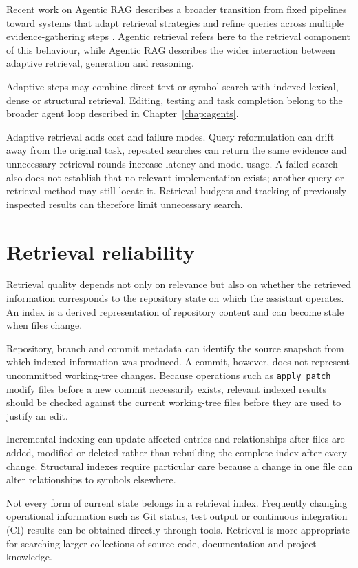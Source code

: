 Recent work on Agentic RAG describes a broader transition from fixed pipelines toward systems that adapt retrieval strategies and refine queries across multiple evidence-gathering steps \parencite{singh2025agenticrag}. Agentic retrieval refers here to the retrieval component of this behaviour, while Agentic RAG describes the wider interaction between adaptive retrieval, generation and reasoning.

Adaptive steps may combine direct text or symbol search with indexed lexical, dense or structural retrieval. Editing, testing and task completion belong to the broader agent loop described in Chapter~\ref{chap:agents}.

Adaptive retrieval adds cost and failure modes. Query reformulation can drift away from the original task, repeated searches can return the same evidence and unnecessary retrieval rounds increase latency and model usage. A failed search also does not establish that no relevant implementation exists; another query or retrieval method may still locate it. Retrieval budgets and tracking of previously inspected results can therefore limit unnecessary search.

\section{Retrieval reliability}
\label{sec:retrieval-reliability}

Retrieval quality depends not only on relevance but also on whether the retrieved information corresponds to the repository state on which the assistant operates. An index is a derived representation of repository content and can become stale when files change.

Repository, branch and commit metadata can identify the source snapshot from which indexed information was produced. A commit, however, does not represent uncommitted working-tree changes. Because operations such as \texttt{apply\_patch} modify files before a new commit necessarily exists, relevant indexed results should be checked against the current working-tree files before they are used to justify an edit.

Incremental indexing can update affected entries and relationships after files are added, modified or deleted rather than rebuilding the complete index after every change. Structural indexes require particular care because a change in one file can alter relationships to symbols elsewhere.

Not every form of current state belongs in a retrieval index. Frequently changing operational information such as Git status, test output or continuous integration (CI) results can be obtained directly through tools. Retrieval is more appropriate for searching larger collections of source code, documentation and project knowledge.

